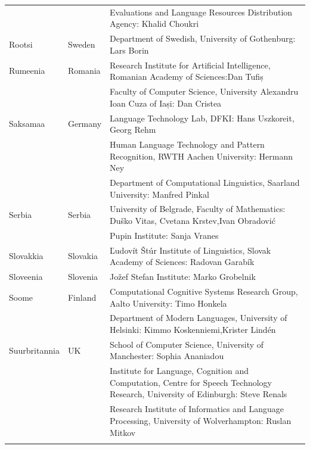 \begin{longtable}{@{}llp{113mm}@{}}
  & & Evaluations and Language Resources Distribution Agency: Khalid Choukri\\ \addlinespace 
  Rootsi & \textcolor{grey1}{Sweden} & Department of Swedish, University of Gothenburg: Lars Borin \\ \addlinespace 
  Rumeenia & \textcolor{grey1}{Romania} & Research Institute for Artificial Intelligence, Romanian Academy of Sciences:\newline Dan Tufiș \\ \addlinespace
  & & Faculty of Computer Science, University Alexandru Ioan Cuza of Iași: Dan Cristea \\ \addlinespace
Saksamaa & \textcolor{grey1}{Germany} & Language Technology Lab, DFKI: Hans Uszkoreit, Georg Rehm\\ \addlinespace
  & & Human Language Technology and Pattern Recognition, RWTH Aachen University: Hermann Ney \\ \addlinespace
  & & Department of Computational Linguistics, Saarland University: Manfred Pinkal\\ \addlinespace 
Serbia & \textcolor{grey1}{Serbia} & University of Belgrade, Faculty of Mathematics: Duško Vitas, Cvetana Krstev,\newline Ivan Obradović \\ \addlinespace
  & & Pupin Institute: Sanja Vranes \\ \addlinespace  
  Slovakkia & \textcolor{grey1}{Slovakia} & Ľudovít Štúr Institute of Linguistics, Slovak Academy of Sciences: Radovan Garabík \\ \addlinespace 
  Sloveenia & \textcolor{grey1}{Slovenia} & Jožef Stefan Institute: Marko Grobelnik \\ \addlinespace 
  Soome & \textcolor{grey1}{Finland} & Computational Cognitive Systems Research Group, Aalto University: Timo Honkela\\ \addlinespace
  & & Department of Modern Languages, University of Helsinki: Kimmo Koskenniemi,\newline Krister Lindén \\ \addlinespace
  Suurbritannia & \textcolor{grey1}{UK} & 
  School of Computer Science, University of Manchester: Sophia Ananiadou \\ \addlinespace 
  & & Institute for Language, Cognition and Computation, Centre for Speech Technology Research, University of Edinburgh: Steve Renals \\ \addlinespace 
  & & Research Institute of Informatics and Language Processing, University of Wolverhampton: Ruslan Mitkov \\ \addlinespace 

\end{longtable}
